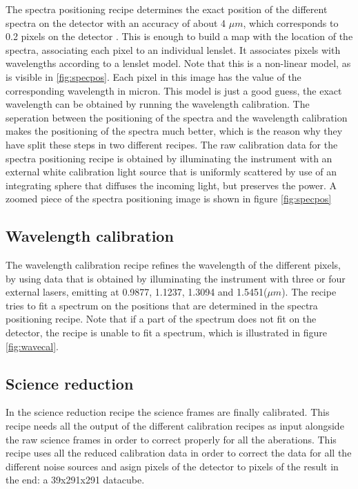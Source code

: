 \documentclass[twoside,single]{lion-msc}
\begin{document}
The spectra positioning recipe determines the exact position of the different spectra on the detector with an accuracy of about 4 $\mu m$, which corresponds to 0.2 pixels on the detector \citep{Desidera2008}. This is enough to build a map with the location of the spectra, associating each pixel to an individual lenslet. It associates pixels with wavelengths according to a lenslet model. Note that this is a non-linear model, as is visible in \ref{fig:specpos}. Each pixel in this image has the value of the corresponding wavelength in micron. This model is just a good guess, the exact wavelength can be obtained by running the wavelength calibration. The seperation between the positioning of the spectra and the wavelength calibration makes the positioning of the spectra much better, which is the reason why they have split these steps in two different recipes. The raw calibration data for the spectra positioning recipe is obtained by illuminating the instrument with an external white calibration light source that is uniformly scattered by use of an integrating sphere that diffuses the incoming light, but preserves the power. A zoomed piece of the spectra positioning image is shown in figure \ref{fig:specpos}

\subsection{Wavelength calibration}
The wavelength calibration recipe refines the wavelength of the different pixels, by using data that is obtained by illuminating the instrument with three or four external lasers, emitting at 0.9877, 1.1237, 1.3094 and 1.5451($\mu m$). The recipe tries to fit a spectrum on the positions that are determined in the spectra positioning recipe. Note that if a part of the spectrum does not fit on the detector, the recipe is unable to fit a spectrum, which is illustrated in figure \ref{fig:wavecal}.

\subsection{Science reduction}
In the science reduction recipe the science frames are finally calibrated. This recipe needs all the output of the different calibration recipes as input alongside the raw science frames in order to correct properly for all the aberations. This recipe uses all the reduced calibration data in order to correct the data for all the different noise sources and asign pixels of the detector to pixels of the result in the end: a 39x291x291 datacube.
\end{document}
